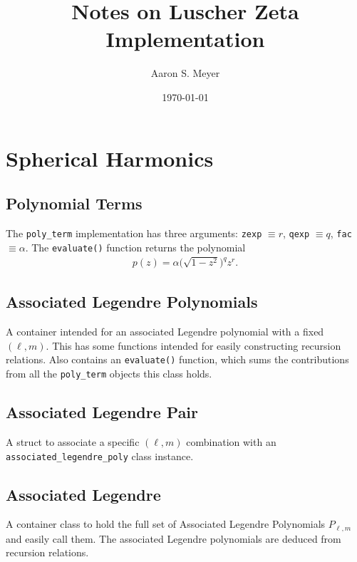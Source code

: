 \documentclass[a4paper]{article}
\newcommand{\llnl}{Lawrence Livermore National Laboratory, Livermore, CA 94550, USA}
\begin{document}
\title{Notes on Luscher Zeta Implementation}
\author{Aaron S. Meyer}
\date{\today}

\maketitle

\section{Spherical Harmonics}

\subsection{Polynomial Terms}

The {\tt poly\_term} implementation has three arguments:
 {\tt zexp} $\equiv r$,
 {\tt qexp} $\equiv q$,
 {\tt fac} $\equiv \alpha$.
The {\tt evaluate()} function returns the polynomial
\begin{align}
 p(z) = \alpha \big( \sqrt{1-z^2} \big)^q z^r.
\end{align}

\subsection{Associated Legendre Polynomials}

A container intended for an associated Legendre polynomial with a fixed $(\ell,m)$.
This has some functions intended for easily constructing recursion relations.
Also contains an {\tt evaluate()} function,
 which sums the contributions from all the {\tt poly\_term}
 objects this class holds.

\subsection{Associated Legendre Pair}

A struct to associate a specific $(\ell,m)$ combination with
 an {\tt associated\_legendre\_poly} class instance.

\subsection{Associated Legendre}

A container class to hold the full set of Associated Legendre Polynomials $P_{\ell,m}$
 and easily call them.
The associated Legendre polynomials are deduced from recursion relations.
\end{document}
